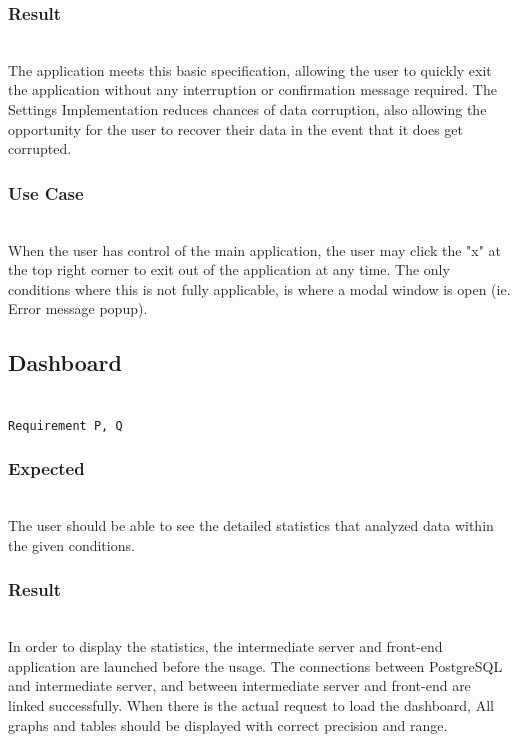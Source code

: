 \documentclass[conference]{IEEEtran}
\begin{document}
\subsubsection{Result}~\\
The application meets this basic specification, allowing the user to quickly exit the application without any interruption or confirmation message required. The Settings Implementation reduces chances of data corruption, also allowing the opportunity for the user to recover their data in the event that it does get corrupted.~\\

\subsubsection{Use Case}~\\
When the user has control of the main application, the user may click the "x" at the top right corner to exit out of the application at any time. The only conditions where this is not fully applicable, is where a modal window is open (ie. Error message popup).\\

\subsection{Dashboard}~\\
\texttt{Requirement P, Q}~\\
\subsubsection{Expected}~\\
The user should be able to see the detailed statistics that analyzed data within the given conditions.~\\

\subsubsection{Result}~\\
In order to display the statistics, the intermediate server and front-end application are launched before the usage. The connections between PostgreSQL and intermediate server, and between intermediate server and front-end are linked successfully. When there is the actual request to load the dashboard, All graphs and tables should be displayed with correct precision and range.~\\
\end{document}
